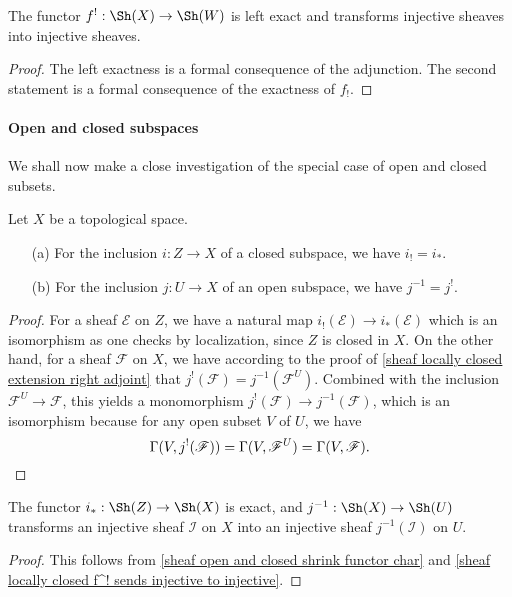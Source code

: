 \begin{proposition}\label{sheaf locally closed f^! sends injective to injective}
The functor $f^!:\Sh(X)\to\Sh(W)$ is left exact and transforms injective sheaves into injective sheaves.
\end{proposition}
\begin{proof}
The left exactness is a formal consequence of the adjunction. The second statement is a formal consequence of the exactness of $f_!$.
\end{proof}

\paragraph{Open and closed subspaces}
We shall now make a close investigation of the special case of open and closed subsets.

\begin{proposition}\label{sheaf open and closed shrink functor char}
Let $X$ be a topological space.
\begin{enumerate}
    \item[(a)] For the inclusion $i:Z\to X$ of a closed subspace, we have $i_!=i_*$.
    \item[(b)] For the inclusion $j:U\to X$ of an open subspace, we have $j^{-1}=j^!$. 
\end{enumerate}
\end{proposition}
\begin{proof}
For a sheaf $\mathscr{E}$ on $Z$, we have a natural map $i_!(\mathscr{E})\to i_*(\mathscr{E})$ which is an isomorphism as one checks by localization, since $Z$ is closed in $X$. On the other hand, for a sheaf $\mathscr{F}$ on $X$, we have according to the proof of \cref{sheaf locally closed extension right adjoint} that $j^!(\mathscr{F})=j^{-1}(\mathscr{F}^U)$. Combined with the inclusion $\mathscr{F}^U\to\mathscr{F}$, this yields a monomorphism $j^!(\mathscr{F})\to j^{-1}(\mathscr{F})$, which is an isomorphism because for any open subset $V$ of $U$, we have
\begin{equation*}
\Gamma(V,j^!(\mathscr{F}))=\Gamma(V,\mathscr{F}^U)=\Gamma(V,\mathscr{F}).\qedhere
\end{equation*}
\end{proof}

\begin{corollary}
The functor $i_*:\Sh(Z)\to\Sh(X)$ is exact, and $j^{-1}:\Sh(X)\to\Sh(U)$ transforms an injective sheaf $\mathscr{I}$ on $X$ into an injective sheaf $j^{-1}(\mathscr{I})$ on $U$.
\end{corollary}
\begin{proof}
This follows from \cref{sheaf open and closed shrink functor char} and \cref{sheaf locally closed f^! sends injective to injective}.
\end{proof}


